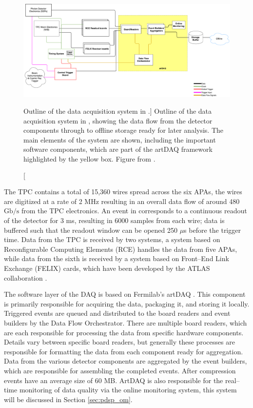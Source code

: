 \begin{figure}

	\centering

	\includegraphics[width=\textwidth]{figures/pdsp_daq.pdf}

	\caption
	[Outline of the data acquisition system in \protodune{}.]
	{Outline of the data acquisition system in \protodune{}, showing the data flow
	from the detector components through to offline storage ready for later
	analysis. The main elements of the system are shown, including the important 
	software components, which are part of the artDAQ framework highlighted by 
	the yellow box. Figure from \cite{Abi2017}.}

	\label{fig:pdsp_daq}

\end{figure}

The \protodune{} TPC contains a total of 15,360 wires spread across the six
APAs, the wires are digitized at a rate of 2 MHz resulting in an overall data
flow of around 480 $\mbox{Gb/s}$ from the TPC electronics. An event in
\protodune{} corresponds to a continuous readout of the detector for 3 ms,
resulting in 6000 samples from each wire; data is buffered such that the readout
window can be opened 250 $\mu$s before the trigger time. Data from the TPC is
received by two systems, a system based on Reconfigurable Computing Elements
(RCE) \cite{7431254} handles the data from five APAs, while data from the sixth 
is received by a system based on Front--End Link Exchange (FELIX) cards, which 
have been developed by the ATLAS collaboration \cite{Anderson_2016}.

The software layer of the \protodune{} DAQ is based on Fermilab's artDAQ 
\cite{6495515}. This component is primarily responsible for acquiring the data,
packaging it, and storing it locally. Triggered events are queued and 
distributed to the board readers and event builders by the Data Flow 
Orchestrator. There are multiple board readers, which are each responsible for 
processing the data from specific hardware components. Details vary between 
specific board readers, but generally these processes are responsible for 
formatting the data from each component ready for aggregation. Data from the
various detector components are aggregated by the event builders, which are
responsible for assembling the completed events. After compression events have
an average size of 60 MB. ArtDAQ is also responsible for the real--time 
monitoring of data quality via the online monitoring system, this system will be
discussed in Section \ref{sec:pdsp_om}.

